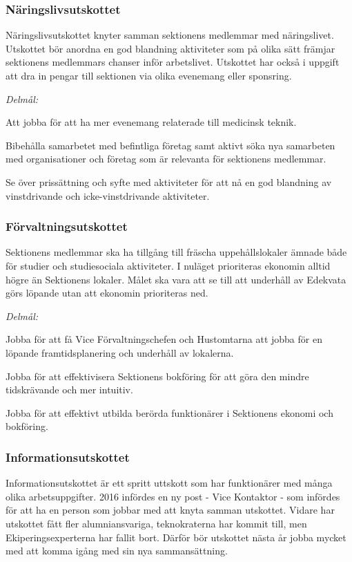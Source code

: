 \documentclass[../_main/handlingar.tex]{subfiles}
\begin{document}
\subsubsection*{Näringslivsutskottet}
Näringslivsutskottet knyter samman sektionens medlemmar med näringslivet. Utskottet bör anordna en god blandning aktiviteter som på olika sätt främjar sektionens medlemmars chanser inför arbetslivet. Utskottet har också i uppgift att dra in pengar till sektionen via olika evenemang eller sponsring.

\emph{Delmål:}
\begin{dashlist}
    \item Att jobba för att ha mer evenemang relaterade till medicinsk teknik.
    \item Bibehålla samarbetet med befintliga företag samt aktivt söka nya samarbeten med organisationer och företag som är relevanta för sektionens medlemmar.
    \item Se över prissättning och syfte med aktiviteter för att nå en god blandning av vinstdrivande och icke-vinstdrivande aktiviteter.
\end{dashlist}

\subsubsection*{Förvaltningsutskottet}
Sektionens medlemmar ska ha tillgång till fräscha uppehållslokaler ämnade både för studier och studiesociala aktiviteter. I nuläget prioriteras ekonomin alltid högre än Sektionens lokaler. Målet ska vara att se till att underhåll av Edekvata görs löpande utan att ekonomin prioriteras ned.

\emph{Delmål:}
\begin{dashlist}
    \item Jobba för att få Vice Förvaltningschefen och Hustomtarna att jobba för en löpande framtidsplanering och underhåll av lokalerna.
    \item Jobba för att effektivisera Sektionens bokföring för att göra den mindre tidskrävande och mer intuitiv.
    \item Jobba för att effektivt utbilda berörda funktionärer i Sektionens ekonomi och bokföring.
\end{dashlist}

\newpage

\subsubsection*{Informationsutskottet}
Informationsutskottet är ett spritt uttskott som har funktionärer med många olika arbetsuppgifter. 2016 infördes en ny post - Vice Kontaktor - som infördes för att ha en person som jobbar med att knyta samman utskottet. Vidare har utskottet fått fler alumniansvariga, teknokraterna har kommit till, men Ekiperingsexperterna har fallit bort. Därför bör utskottet nästa år jobba mycket med att komma igång med sin nya sammansättning.
\end{document}
